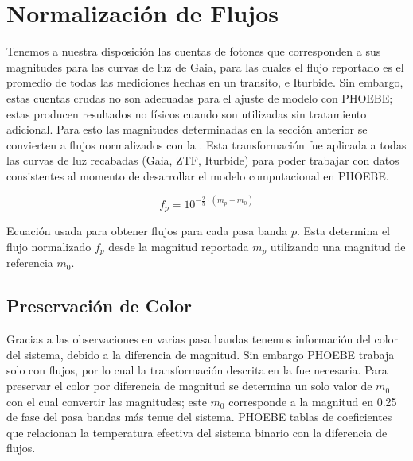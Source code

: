 \section{Normalización de Flujos} \label{Metodologia:NormalizacionFlujos}

Tenemos a nuestra disposición las cuentas de fotones que corresponden a sus
magnitudes para las curvas de luz de Gaia, para las cuales el flujo reportado es
el promedio de todas las mediciones hechas en un transito, e Iturbide. Sin
embargo, estas cuentas crudas no son adecuadas para el ajuste de modelo con
PHOEBE; estas producen resultados no físicos cuando son utilizadas sin
tratamiento adicional. Para esto las magnitudes determinadas en la sección
anterior se convierten a flujos normalizados con la
. Esta transformación fue aplicada a todas las
curvas de luz recabadas (Gaia, ZTF, Iturbide) para poder trabajar con datos
consistentes al momento de desarrollar el modelo computacional en PHOEBE.

\begin{eqfloat}[!ht]
	\centering
	\begin{equation}
		f_p = 10^{-\frac{2}{5} \cdot (m_p - m_0)}
	\end{equation}
	\caption{Ecuación usada para obtener flujos para cada pasa banda $p$. Esta
		determina el flujo normalizado $f_p$ desde la magnitud reportada $m_p$
		utilizando una magnitud de referencia $m_0$.}
	\label{normFlujosEcuacion}
\end{eqfloat}

\subsection{Preservación de Color}

Gracias a las observaciones en varias pasa bandas tenemos información del color
del sistema, debido a la diferencia de magnitud. Sin embargo PHOEBE trabaja solo
con flujos, por lo cual la transformación descrita en la
 fue necesaria. Para preservar el
color por diferencia de magnitud se determina un solo valor de $m_0$ con el cual
convertir las magnitudes; este $m_0$ corresponde a la magnitud en 0.25 de fase
del pasa bandas más tenue del sistema. PHOEBE tablas de coeficientes que
relacionan la temperatura efectiva del sistema binario con la diferencia de
flujos.  

